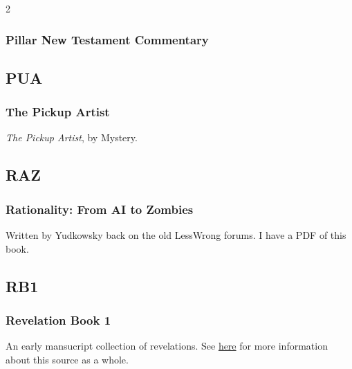 \begin{multicols}{2}
		\subsubsection*{Pillar New Testament Commentary}
		
			\phantom{.}
			
	\subsection*{PUA}
	
		\subsubsection*{The Pickup Artist}
		
			\textit{The Pickup Artist}, by Mystery.
			
	\subsection*{RAZ}
	
		\subsubsection*{Rationality: From AI to Zombies}
		
			Written by Yudkowsky back on the old LessWrong forums. I have a PDF of this book.
			
	\subsection*{RB1}
	
		\subsubsection*{Revelation Book 1}
		
			An early mansucript collection of revelations. See \href{https://www.josephsmithpapers.org/paper-summary/revelation-book-1/1#source-note}{here} for more information about this source as a whole.
			

\end{multicols}
